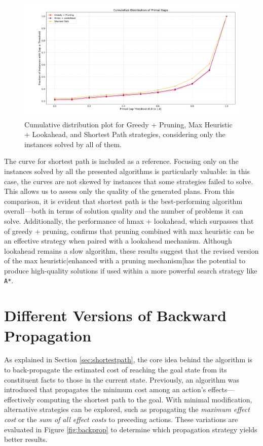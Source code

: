 \begin{figure}[h!]
	\centering
	\includegraphics[width=\textwidth]{images/algs234_solved_all.png}
	\caption{Cumulative distribution plot for Greedy + Pruning, Max Heuristic + Lookahead, and Shortest Path strategies,
		considering only the instances solved by all of them.}
	\label{fig:algs234_solved_all}
\end{figure}

The curve for shortest path is included as a reference. Focusing only on the instances solved by all the presented algorithms
is particularly valuable: in this case, the curves are not skewed by instances that some strategies failed to solve.
This allows us to assess only the quality of the generated plans. From this comparison, it is evident that shortest path
is the best-performing algorithm overall—both in terms of solution quality and the number of problems it can solve.
Additionally, the performance of hmax + lookahead, which surpasses that of greedy + pruning, confirms that pruning combined
with max heuristic can be an effective strategy when paired with a lookahead mechanism.
Although lookahead remains a slow algorithm, these results suggest that the revised version of the max heuristic|enhanced
with a pruning mechanism|has the potential to produce high-quality solutions if used within a more powerful search strategy
like \verb|A*|.

\section{Different Versions of Backward Propagation}
As explained in Section \ref{sec:shortestpath}, the core idea behind the algorithm is to back-propagate the estimated cost
of reaching the goal state from its constituent facts to those in the current state. Previously, an algorithm was introduced
that propagates the minimum cost among an action's effects—effectively computing the shortest path to the goal.
With minimal modification, alternative strategies can be explored, such as propagating the \textit{maximum effect cost} or the
\textit{sum of all effect costs} to preceding actions. These variations are evaluated in Figure \ref{fig:backprop} to determine which
propagation strategy yields better results.

